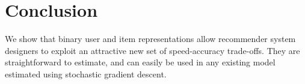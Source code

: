 \documentclass[sigchi]{acmart}
\begin{document}
\section{Conclusion}
We show that binary user and item representations allow recommender system designers to exploit an attractive new set of speed-accuracy trade-offs. They are straightforward to estimate, and can easily be used in any existing model estimated using stochastic gradient descent.




\end{document}
